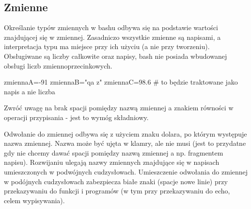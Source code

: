 % 
% 
% 
% 


\subsection{Zmienne}

Określanie typów zmiennych w bashu odbywa się na podstawie wartości znajdującej się w zmiennej.
Zasadniczo wszystkie zmienne są napisami, a interpretacja typu ma miejsce przy ich użyciu (a nie przy tworzeniu).
Obsługiwane są liczby całkowite oraz napisy, bash nie posiada wbudowanej obsługi liczb zmiennoprzecinkowych.

\begin{CodeFrame*}[bash]{}
zmiennaA=-91
zmiennaB="qa   z"
zmiennaC=98.6 # to będzie traktowane jako napis a nie liczba
\end{CodeFrame*}
Zwróć uwagę na brak spacji pomiędzy nazwą zmiennej a znakiem równości w operacji przypisania - jest to wymóg składniowy.

Odwołanie do zmiennej odbywa się z użyciem znaku dolara, po którym występuje nazwa zmiennej. Nazwa może być ujęta w klamry, ale nie musi (jest to przydatne gdy nie chcemy dawać spacji pomiędzy nazwą zmiennej a np. fragmentem napisu). Rozwijaniu ulegają nazwy zmiennych znajdujące się w napisach umieszczonych w podwójnych cudzysłowach. Umieszczenie odwołania do zmiennej w podójnych cudzysłowach zabezpiecza białe znaki (spacje nowe linie) przy przekazywaniu do funkcji i programów (w tym przy przekazywaniu do echo, celem wypisywania).

